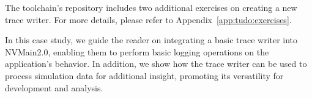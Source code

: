The toolchain’s repository includes two additional exercises on creating a new trace writer. For more details, please refer to Appendix~\cref{app:tudo:exercises}.



\begin{insightbox}
In this case study, we guide the reader on integrating a basic trace writer into NVMain2.0, enabling them to perform basic logging operations on the application's behavior. In addition, we show how the trace writer can be used to process simulation data for additional insight, promoting its versatility for development and analysis.
\end{insightbox}